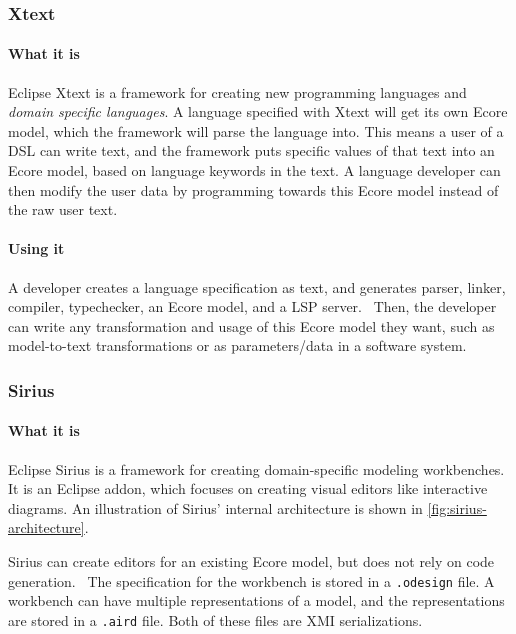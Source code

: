 
\subsubsection{Xtext}\label{sec:xtext}

\paragraph*{What it is}
Eclipse Xtext is a framework for creating new programming languages and \emph{domain specific languages}.
A language specified with Xtext will get its own \gls{Ecore} model, which the framework will parse the language into.
This means a user of a \gls{DSL} can write text, and the framework puts specific values of that text into an Ecore model, based on language keywords in the text.
A language developer can then modify the user data by programming towards this \gls{Ecore} model instead of the raw user text.~\cite{eclipsefoundationEclipseXtext2020}

\paragraph*{Using it}
A developer creates a language specification as text, and generates parser, linker, compiler, typechecker, an \gls{Ecore} model, and a \gls{LSP} server.~\cite{eclipsefoundationXtextLanguageEngineering}
Then, the developer can write any transformation and usage of this \gls{Ecore} model they want, such as model-to-text transformations or as parameters/data in a software system.

\subsubsection{Sirius}\label{sec:sirius}
\paragraph*{What it is} Eclipse Sirius is a framework for creating  domain-specific modeling workbenches.~\cite{eclipsefoundationSiriusEasiestWay}
It is an \gls{Eclipse} addon, which focuses on creating visual editors like interactive diagrams.
An illustration of Sirius' internal architecture is shown in \cref{fig:sirius-architecture}.

Sirius can create editors for an existing \gls{Ecore} model, but does not rely on code generation.~\cite{eclipsefoundationSiriusEasiestWay}
The specification for the workbench is stored in a \texttt{.odesign} file.
A workbench can have multiple representations of a model, and the representations are stored in a \texttt{.aird} file.
Both of these files are \acrshort{XMI} serializations.

